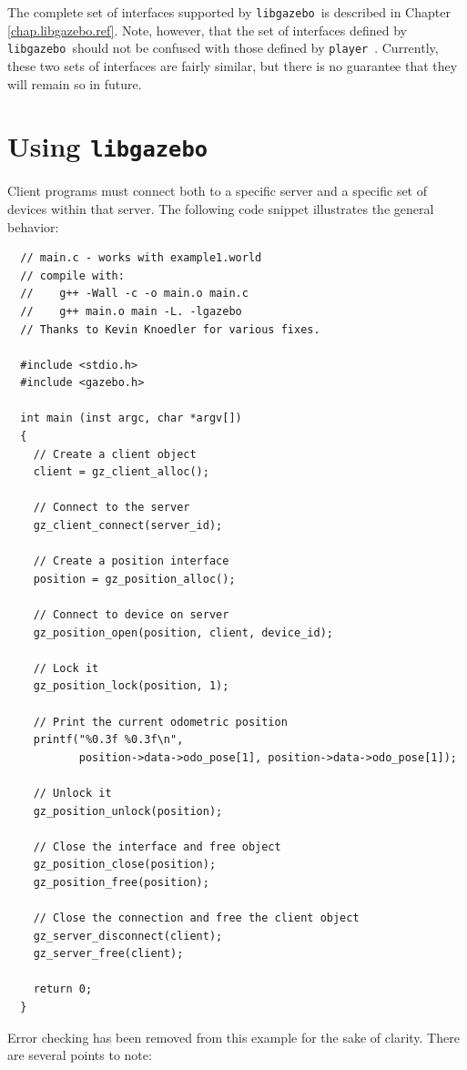 \documentclass[11pt]{report}
\def\player {{\tt player}~}
\def\libgazebo {{\tt libgazebo}~}
\begin{document}
The complete set of interfaces supported by \libgazebo is described in
Chapter \ref{chap.libgazebo.ref}.  Note, however, that the set of
interfaces defined by \libgazebo should not be confused with those
defined by \player.  Currently, these two sets of interfaces are
fairly similar, but there is no guarantee that they will remain so in
future.


\section{Using \libgazebo}

Client programs must connect both to a specific server and a specific
set of devices within that server.  The following code snippet
illustrates the general behavior:
  \begin{verbatim}
  // main.c - works with example1.world
  // compile with:
  //    g++ -Wall -c -o main.o main.c
  //    g++ main.o main -L. -lgazebo
  // Thanks to Kevin Knoedler for various fixes.

  #include <stdio.h>
  #include <gazebo.h>

  int main (inst argc, char *argv[])
  {
    // Create a client object
    client = gz_client_alloc();  

    // Connect to the server
    gz_client_connect(server_id);

    // Create a position interface
    position = gz_position_alloc();

    // Connect to device on server
    gz_position_open(position, client, device_id);

    // Lock it
    gz_position_lock(position, 1);

    // Print the current odometric position
    printf("%0.3f %0.3f\n", 
           position->data->odo_pose[1], position->data->odo_pose[1]); 

    // Unlock it
    gz_position_unlock(position);

    // Close the interface and free object
    gz_position_close(position);
    gz_position_free(position);

    // Close the connection and free the client object
    gz_server_disconnect(client);
    gz_server_free(client);

    return 0;
  }
  \end{verbatim}
Error checking has been removed from this example for the sake of
clarity.  There are several points to note:
\end{document}
